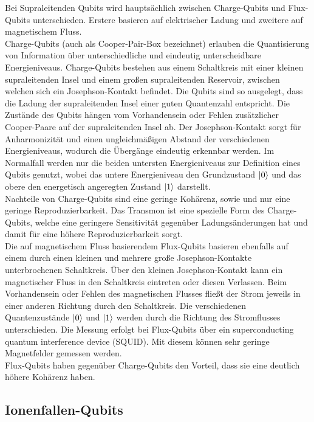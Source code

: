 Bei Supraleitenden Qubits wird hauptsächlich zwischen Charge-Qubits und Flux-Qubits unterschieden. Erstere basieren auf elektrischer Ladung und zweitere auf magnetischem Fluss.\\
Charge-Qubits (auch als Cooper-Pair-Box bezeichnet) erlauben die Quantisierung von Information über unterschiedliche und eindeutig unterscheidbare Energieniveaus. Charge-Qubits bestehen aus einem Schaltkreis mit einer kleinen supraleitenden Insel und einem großen supraleitenden Reservoir, zwischen welchen sich ein Josephson-Kontakt befindet.
Die Qubits sind so ausgelegt, dass die Ladung der supraleitenden Insel einer guten Quantenzahl entspricht. Die Zustände des Qubits hängen vom Vorhandensein oder Fehlen zusätzlicher Cooper-Paare auf der supraleitenden Insel ab.
Der Josephson-Kontakt sorgt für Anharmonizität und einen ungleichmäßigen Abstand der verschiedenen Energieniveaus, wodurch die Übergänge eindeutig erkennbar werden. Im Normalfall werden nur die beiden untersten Energieniveaus zur Definition eines Qubits genutzt, wobei das untere Energieniveau den Grundzustand $\ket0$ und das obere den energetisch angeregten Zustand $\ket1$ darstellt.\\
Nachteile von Charge-Qubits sind eine geringe Kohärenz, sowie und nur eine geringe Reproduzierbarkeit. Das Transmon ist eine spezielle Form des Charge-Qubits, welche eine geringere Sensitivität gegenüber Ladungsänderungen hat und damit für eine höhere Reproduzierbarkeit sorgt.\\ 

Die auf magnetischem Fluss basierendem Flux-Qubits basieren ebenfalls auf einem durch einen kleinen und mehrere große Josephson-Kontakte unterbrochenen Schaltkreis.
Über den kleinen Josephson-Kontakt kann ein magnetischer Fluss in den Schaltkreis eintreten oder diesen Verlassen. Beim Vorhandensein oder Fehlen des magnetischen Flusses fließt der Strom jeweils in einer anderen Richtung durch den Schaltkreis. Die verschiedenen Quantenzustände $\ket0$ und $\ket1$ werden durch die Richtung des Stromflusses unterschieden. Die Messung erfolgt bei Flux-Qubits über ein superconducting quantum interference device (SQUID). Mit diesem können sehr geringe Magnetfelder gemessen werden.\\
Flux-Qubits haben gegenüber Charge-Qubits den Vorteil, dass sie eine deutlich höhere Kohärenz haben.


\subsection{Ionenfallen-Qubits }

